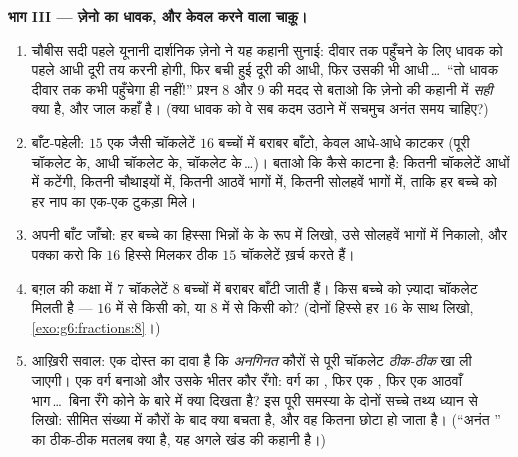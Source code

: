 \begin{problem}
\medskip
\noindent\textbf{भाग III --- ज़ेनो का धावक, और केवल  करने
वाला चाक़ू।}
\begin{enumerate}[resume]
  \item चौबीस सदी पहले यूनानी दार्शनिक ज़ेनो ने यह कहानी सुनाई:
        दीवार तक पहुँचने के लिए धावक को पहले आधी दूरी तय करनी
        होगी, फिर बची हुई दूरी की आधी, फिर उसकी भी
        आधी\,\dots\ ``तो धावक दीवार तक कभी पहुँचेगा ही नहीं!''
        प्रश्न 8 और 9 की मदद से बताओ कि ज़ेनो की कहानी में
        \emph{सही} क्या है, और जाल कहाँ है। (क्या धावक को वे सब
        कदम उठाने में सचमुच अनंत समय चाहिए?)
  \item बाँट-पहेली: $15$ एक जैसी चॉकलेटें $16$ बच्चों में बराबर
        बाँटो, केवल आधे-आधे काटकर (पूरी चॉकलेट के, आधी चॉकलेट
        के,  चॉकलेट के\,\dots)। बताओ कि कैसे काटना है:
        कितनी चॉकलेटें आधों में कटेंगी, कितनी चौथाइयों में,
        कितनी आठवें भागों में, कितनी सोलहवें भागों में, ताकि हर
        बच्चे को हर नाप का एक-एक टुकड़ा मिले।
  \item अपनी बाँट जाँचो: हर बच्चे का हिस्सा भिन्नों के  के
        रूप में लिखो, उसे सोलहवें भागों में निकालो, और पक्का करो
        कि $16$ हिस्से मिलकर ठीक $15$ चॉकलेटें ख़र्च करते हैं।
  \item बग़ल की कक्षा में $7$ चॉकलेटें $8$ बच्चों में बराबर बाँटी
        जाती हैं। किस बच्चे को ज़्यादा चॉकलेट मिलती है --- $16$
        में से किसी को, या $8$ में से किसी को? (दोनों हिस्से हर
        $16$ के साथ लिखो, \cref{exo:g6:fractions:8}।)
  \item आख़िरी सवाल: एक दोस्त का दावा है कि \emph{अनगिनत} कौरों
        से पूरी चॉकलेट \emph{ठीक-ठीक} खा ली जाएगी। एक वर्ग बनाओ
        और उसके भीतर कौर रँगो: वर्ग का , फिर एक , फिर एक
        आठवाँ भाग\,\dots\ बिना रँगे कोने के बारे में क्या दिखता
        है? इस पूरी समस्या के दोनों सच्चे तथ्य ध्यान से लिखो:
        सीमित संख्या में कौरों के बाद क्या बचता है, और वह 
        कितना छोटा हो जाता है। (``अनंत '' का ठीक-ठीक मतलब
        क्या है, यह अगले खंड की कहानी है।)
\end{enumerate}
\end{problem}
